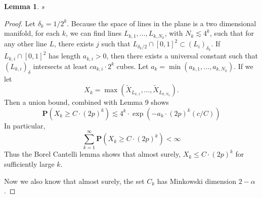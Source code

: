 \documentclass[dvipsnames]{article}
\theoremstyle{plain}
\newtheorem{lemma}{Lemma}
\theoremstyle{plain}
\begin{document}
\begin{lemma}
	s
\end{lemma}
\begin{proof}
	Let $\delta_k = 1/2^k$. Because the space of lines in the plane is a two dimensional manifold, for each $k$, we can find lines $L_{k,1}, \dots, L_{k,N_k}$, with $N_k \lesssim 4^k$, such that for any other line $L$, there exists $j$ such that $L_{\delta_k / 2} \cap [0,1]^2 \subset (L_i)_{\delta_k}$. If $L_{k,i} \cap [0,1]^2$ has length $a_{k,i} > 0$, then there exists a universal constant such that $(L_{k,i})_\delta$ intersects at least $c a_{k,i} \cdot 2^k$ cubes. Let $a_k = \min(a_{k,1}, \dots, a_{k,N_k})$. If we let
	\[ X_k = \max(\tilde{X}_{L_{k,1}}, \dots, \tilde{X}_{L_{k,N_k}}). \]
	Then a union bound, combined with Lemma 9 shows
	\[ \mathbf{P} \left( X_k \geq C \cdot (2p)^k \right) \lesssim 4^k \cdot \exp(- a_k \cdot (2p)^k (c/ C)) \]
	In particular,
	\[ \sum_{k = 1}^\infty \mathbf{P} \left( X_k \geq C \cdot (2p)^k \right) < \infty \]
	Thus the Borel Cantelli lemma shows that almost surely, $X_k \leq C \cdot (2p)^k$ for sufficiently large $k$.


	Now we also know that almost surely, the set $C_k$ has Minkowski dimension $2 - \alpha$.





\end{proof}
\end{document}
